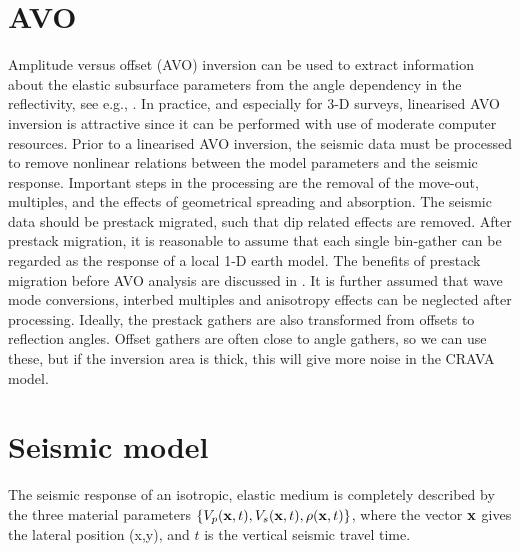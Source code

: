 \section{AVO}
Amplitude versus offset (AVO) inversion can be used to extract
information about the elastic subsurface parameters from the angle
dependency in the reflectivity, see e.g.,
\cite{hamp90,lort93,pan94,bula96b}. In practice, and especially for
3-D surveys, linearised AVO inversion is attractive since it can be
performed with use of moderate computer resources. Prior to a
linearised AVO inversion, the seismic data must be processed to remove
nonlinear relations between the model parameters and the seismic
response. Important steps in the processing are the removal of the
move-out, multiples, and the effects of geometrical spreading and
absorption. The seismic data should be prestack migrated, such that
dip related effects are removed. After prestack migration, it is
reasonable to assume that each single bin-gather can be regarded as
the response of a local 1-D earth model. The benefits of prestack
migration before AVO analysis are discussed in
\cite{brow92,mosh96,bula2001d}. It is further assumed that wave mode
conversions, interbed multiples and  anisotropy effects can be
neglected after processing.  Ideally, the prestack gathers are also
transformed from offsets to reflection angles. Offset gathers are often close
to angle gathers, so we can use these, but if the inversion area is
thick, this will give more noise in the CRAVA model.

\section{Seismic model}

The seismic response of an isotropic, elastic medium is completely
described by the three material parameters $\{V_p(\mathbf{x},t),
V_s(\mathbf{x},t), \rho(\mathbf{x},t)\}$, where the vector $\mathbf{x}$
gives the lateral position (x,y), and $t$ is the vertical seismic
travel time.

